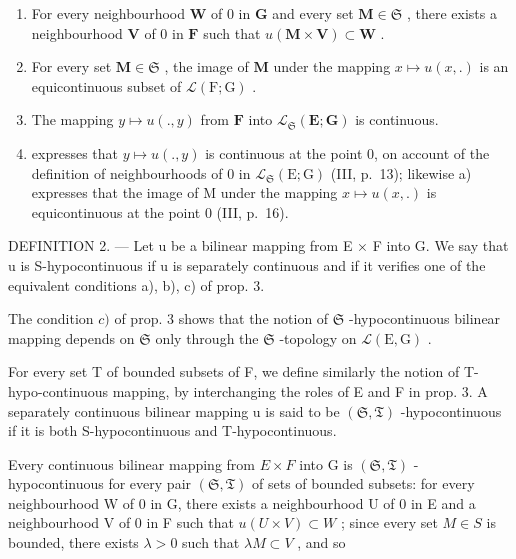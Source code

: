 \begin{enumerate}
\def\labelenumi{\alph{enumi})}
\item
  For every neighbourhood \(\mathbf{W}\) of 0 in \(\mathbf{G}\) and every set \(\mathbf{M} \in \mathfrak{S}\) , there exists a neighbourhood \(\mathbf{V}\) of 0 in \(\mathbf{F}\) such that \(u(\mathbf{M} \times \mathbf{V}) \subset \mathbf{W}\) .
\item
  For every set \(\mathbf{M} \in \mathfrak{S}\) , the image of \(\mathbf{M}\) under the mapping \(x \mapsto u(x, .)\) is an equicontinuous subset of \(\mathcal{L}(\mathrm{F}; \mathrm{G})\) .
\item
  The mapping \(y \mapsto u(., y)\) from \(\mathbf{F}\) into \(\mathcal{L}_{\mathfrak{S}}(\mathbf{E}; \mathbf{G})\) is continuous.
\item
  expresses that \(y \mapsto u(., y)\) is continuous at the point 0, on account of the definition of neighbourhoods of 0 in \(\mathcal{L}_{\mathfrak{S}}(\mathrm{E}; \mathrm{G})\) (III, p.~13); likewise a) expresses that the image of M under the mapping \(x \mapsto u(x, .)\) is equicontinuous at the point 0 (III, p.~16).
\end{enumerate}

DEFINITION 2. --- Let u be a bilinear mapping from E × F into G. We say that u is S-hypocontinuous if u is separately continuous and if it verifies one of the equivalent conditions a), b), c) of prop. 3.

The condition \(c)\) of prop. 3 shows that the notion of \(\mathfrak{S}\) -hypocontinuous bilinear mapping depends on \(\mathfrak{S}\) only through the \(\mathfrak{S}\) -topology on \(\mathcal{L}(\mathrm{E},\mathrm{G})\) .

For every set T of bounded subsets of F, we define similarly the notion of T-hypo-continuous mapping, by interchanging the roles of E and F in prop. 3. A separately continuous bilinear mapping u is said to be \((\mathfrak{S}, \mathfrak{T})\) -hypocontinuous if it is both S-hypocontinuous and T-hypocontinuous.

Every continuous bilinear mapping from \(E \times F\) into G is \((\mathfrak{S}, \mathfrak{T})\) -hypocontinuous for every pair \((\mathfrak{S}, \mathfrak{T})\) of sets of bounded subsets: for every neighbourhood W of 0 in G, there exists a neighbourhood U of 0 in E and a neighbourhood V of 0 in F such that \(u(U \times V) \subset W\) ; since every set \(M \in S\) is bounded, there exists \(\lambda > 0\) such that \(\lambda M \subset V\) , and so


